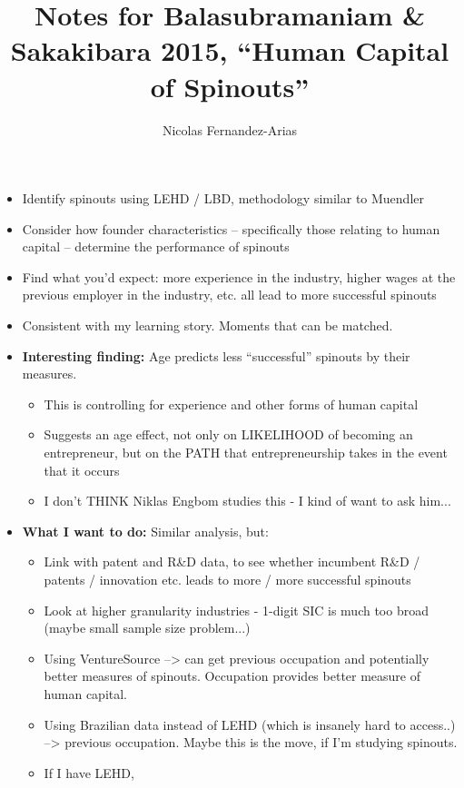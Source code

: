 \documentclass[12pt,english]{article}
\theoremstyle{remark}
\begin{document}
\title{Notes for Balasubramaniam \& Sakakibara 2015, ``Human Capital of Spinouts''}
\author{Nicolas Fernandez-Arias}
\maketitle

\begin{itemize}
	\item Identify spinouts using LEHD / LBD, methodology similar to Muendler
	\item Consider how founder characteristics -- specifically those relating to human capital -- determine the performance of spinouts
	\item Find what you'd expect: more experience in the industry, higher wages at the previous employer in the industry, etc. all lead to more successful spinouts
	\item Consistent with my learning story. Moments that can be matched.
	\item \textbf{Interesting finding:} Age predicts less ``successful'' spinouts by their measures.
	\begin{itemize}
		\item This is controlling for experience and other forms of human capital
		\item Suggests an age effect, not only on LIKELIHOOD of becoming an entrepreneur, but on the PATH that entrepreneurship takes in the event that it occurs
		\item I don't THINK Niklas Engbom studies this - I kind of want to ask him...
	\end{itemize}
	\item \textbf{What I want to do:} Similar analysis, but:
	\begin{itemize}
		\item Link with patent and R\&D data, to see whether incumbent R\&D / patents / innovation etc. leads to more / more successful spinouts
		\item Look at higher granularity industries - 1-digit SIC is much too broad (maybe small sample size problem...)
		\item Using VentureSource --> can get previous occupation and potentially better measures of spinouts. Occupation provides better measure of human capital. 
		\item Using Brazilian data instead of LEHD (which is insanely hard to access..) --> previous occupation. Maybe this is the move, if I'm studying spinouts.
		\item If I have LEHD, 
	\end{itemize}
\end{itemize}
\end{document}
